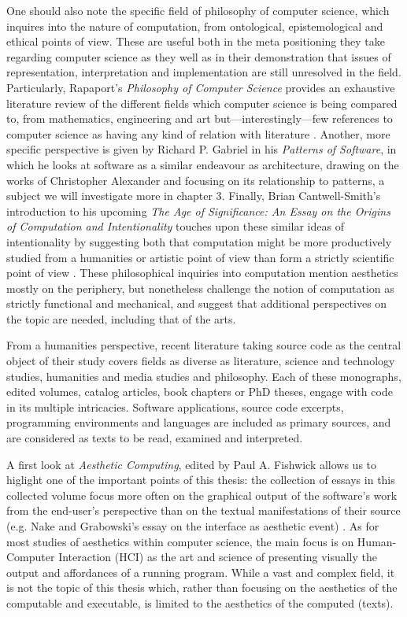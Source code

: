 One should also note the specific field of philosophy of computer science, which inquires into the nature of computation, from ontological, epistemological and ethical points of view. These are useful both in the meta positioning they take regarding computer science as they well as in their demonstration that issues of representation, interpretation and implementation are still unresolved in the field. Particularly, Rapaport's \emph{Philosophy of Computer Science} provides an exhaustive literature review of the different fields which computer science is being compared to, from mathematics, engineering and art but—interestingly—few references to computer science as having any kind of relation with literature \citep{rapaport_philosophy_2005}. Another, more specific perspective is given by Richard P. Gabriel in his \emph{Patterns of Software}, in which he looks at software as a similar endeavour as architecture, drawing on the works of Christopher Alexander and focusing on its relationship to patterns, a subject we will investigate more in chapter 3. Finally, Brian Cantwell-Smith's introduction to his upcoming \emph{The Age of Significance: An Essay on the Origins of Computation and Intentionality} touches upon these similar ideas of intentionality by suggesting both that computation might be more productively studied from a humanities or artistic point of view than form a strictly scientific point of view \citep{smith_origin_1998}. These philosophical inquiries into computation mention aesthetics mostly on the periphery, but nonetheless challenge the notion of computation as strictly functional and mechanical, and suggest that additional perspectives on the topic are needed, including that of the arts.

From a humanities perspective, recent literature taking source code as the central object of their study covers fields as diverse as literature, science and technology studies, humanities and media studies and philosophy. Each of these monographs, edited volumes, catalog articles, book chapters or PhD theses, engage with code in its multiple intricacies. Software applications, source code excerpts, programming environments and languages are included as primary sources, and are considered as texts to be read, examined and interpreted.

A first look at \emph{Aesthetic Computing}, edited by Paul A. Fishwick allows us to higlight one of the important points of this thesis: the collection of essays in this collected volume focus more often on the graphical output of the software's work from the end-user's perspective than on the textual manifestations of their source (e.g. Nake and Grabowski's essay on the interface as aesthetic event) \citep{fishwick_aesthetic_2006a}. As for most studies of aesthetics within computer science, the main focus is on Human-Computer Interaction (HCI) as the art and science of presenting visually the output and affordances of a running program. While a vast and complex field, it is not the topic of this thesis which, rather than focusing on the aesthetics of the computable and executable, is limited to the aesthetics of the computed (texts).

